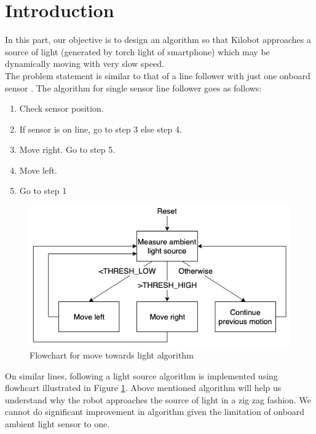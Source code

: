 \section{Introduction}
In this part, our objective is to design an algorithm so that Kilobot approaches a source of light (generated by torch light of smartphone) which may be dynamically moving with very slow speed.\\
The problem statement is similar to that of a line follower with just one onboard sensor \cite{simple-line-follower}. The algorithm for single sensor line follower goes as follows:
\begin{enumerate}
	\item Check sensor position.
	\item If sensor is on line, go to step 3 else step 4.
	\item Move right. Go to step 5.
	\item Move left.
	\item Go to step 1
\end{enumerate}
\begin{figure}[H]
	\centering
	\includegraphics[scale=0.5]{images/move_towards_light_algorithm}
	\caption{Flowchart for move towards light algorithm}
	\label{fig:move_towards_light_algorithm}
\end{figure}
On similar lines, following a light source algorithm is implemented using flowhcart illustrated in Figure \ref{fig:move_towards_light_algorithm}.
Above mentioned algorithm will help us understand why the robot approaches the source of light in a zig zag fashion. We cannot do significant improvement in algorithm given the limitation of onboard ambient light sensor to one.
